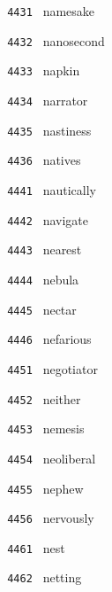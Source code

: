 \documentclass[11pt]{article}
\begin{document}
\begin{multicols}{6}
\noindent \texttt{ 4431 } \hspace{1mm} namesake  \par
\noindent \texttt{ 4432 } \hspace{1mm} nanosecond  \par
\noindent \texttt{ 4433 } \hspace{1mm} napkin  \par
\noindent \texttt{ 4434 } \hspace{1mm} narrator  \par
\noindent \texttt{ 4435 } \hspace{1mm} nastiness  \par
\noindent \texttt{ 4436 } \hspace{1mm} natives  \par
\noindent \texttt{ 4441 } \hspace{1mm} nautically  \par
\noindent \texttt{ 4442 } \hspace{1mm} navigate  \par
\noindent \texttt{ 4443 } \hspace{1mm} nearest  \par
\noindent \texttt{ 4444 } \hspace{1mm} nebula  \par
\noindent \texttt{ 4445 } \hspace{1mm} nectar  \par
\noindent \texttt{ 4446 } \hspace{1mm} nefarious  \par
\noindent \texttt{ 4451 } \hspace{1mm} negotiator  \par
\noindent \texttt{ 4452 } \hspace{1mm} neither  \par
\noindent \texttt{ 4453 } \hspace{1mm} nemesis  \par
\noindent \texttt{ 4454 } \hspace{1mm} neoliberal  \par
\noindent \texttt{ 4455 } \hspace{1mm} nephew  \par
\noindent \texttt{ 4456 } \hspace{1mm} nervously  \par
\noindent \texttt{ 4461 } \hspace{1mm} nest  \par
\noindent \texttt{ 4462 } \hspace{1mm} netting  \par

\end{multicols}
\end{document}
